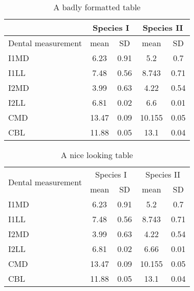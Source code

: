 \begin{table}
\caption{A badly formatted table}
\centering
\label{table:bad_table}
\begin{tabular}{|l|c|c|c|c|}
\hline 
& \multicolumn{2}{c}{Species I} & \multicolumn{2}{c|}{Species II} \\ 
\hline
Dental measurement  & mean & SD  & mean & SD  \\ \hline 
\hline
I1MD & 6.23 & 0.91 & 5.2  & 0.7  \\
\hline 
I1LL & 7.48 & 0.56 & 8.743  & 0.71 \\
\hline 
I2MD & 3.99 & 0.63 & 4.22 & 0.54 \\
\hline 
I2LL & 6.81 & 0.02 & 6.6 & 0.01 \\
\hline 
CMD & 13.47 & 0.09 & 10.155 & 0.05 \\
\hline 
CBL & 11.88 & 0.05 & 13.1 & 0.04\\ 
\hline 
\end{tabular}
\end{table}

\begin{table}
\caption{A nice looking table}
\centering
\label{table:nice_table}
\begin{tabular}{l c c c c}
\hline 
\multirow{2}{*}{Dental measurement} & \multicolumn{2}{c}{Species I} & \multicolumn{2}{c}{Species II} \\ 
\cline{2-5}
  & mean & SD  & mean & SD  \\ 
\hline
I1MD & 6.23 & 0.91 & 5.2  & 0.7  \\

I1LL & 7.48 & 0.56 & 8.743  & 0.71 \\

I2MD & 3.99 & 0.63 & 4.22 & 0.54 \\

I2LL & 6.81 & 0.02 & 6.66 & 0.01 \\

CMD & 13.47 & 0.09 & 10.155 & 0.05 \\

CBL & 11.88 & 0.05 & 13.1 & 0.04\\ 
\hline 
\end{tabular}
\end{table}

